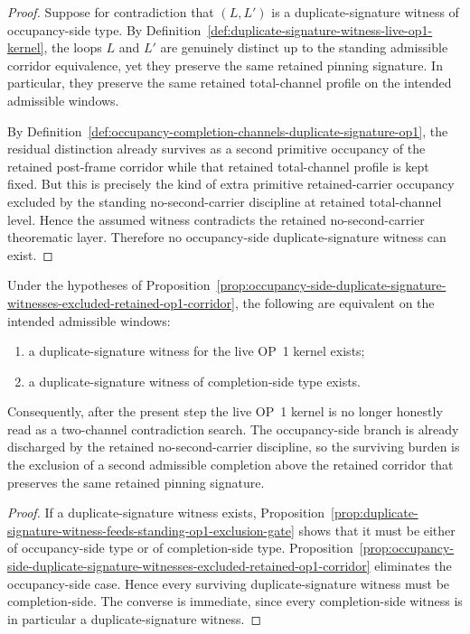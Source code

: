 \begin{proof}
Suppose for contradiction that \((L,L')\) is a duplicate-signature witness of occupancy-side type. By Definition~\ref{def:duplicate-signature-witness-live-op1-kernel}, the loops \(L\) and \(L'\) are genuinely distinct up to the standing admissible corridor equivalence, yet they preserve the same retained pinning signature. In particular, they preserve the same retained total-channel profile on the intended admissible windows.

By Definition~\ref{def:occupancy-completion-channels-duplicate-signature-op1}, the residual distinction already survives as a second primitive occupancy of the retained post-frame corridor while that retained total-channel profile is kept fixed. But this is precisely the kind of extra primitive retained-carrier occupancy excluded by the standing no-second-carrier discipline at retained total-channel level. Hence the assumed witness contradicts the retained no-second-carrier theorematic layer. Therefore no occupancy-side duplicate-signature witness can exist.
\end{proof}

\begin{corollary}
\label{cor:live-op1-duplicate-signature-burden-reduces-completion-side-channel}
Under the hypotheses of Proposition~\ref{prop:occupancy-side-duplicate-signature-witnesses-excluded-retained-op1-corridor}, the following are equivalent on the intended admissible windows:
\begin{enumerate}[label=(\roman*)]
    \item a duplicate-signature witness for the live OP~1 kernel exists;
    \item a duplicate-signature witness of completion-side type exists.
\end{enumerate}
Consequently, after the present step the live OP~1 kernel is no longer honestly read as a two-channel contradiction search. The occupancy-side branch is already discharged by the retained no-second-carrier discipline, so the surviving burden is the exclusion of a second admissible completion above the retained corridor that preserves the same retained pinning signature.
\end{corollary}

\begin{proof}
If a duplicate-signature witness exists, Proposition~\ref{prop:duplicate-signature-witness-feeds-standing-op1-exclusion-gate} shows that it must be either of occupancy-side type or of completion-side type. Proposition~\ref{prop:occupancy-side-duplicate-signature-witnesses-excluded-retained-op1-corridor} eliminates the occupancy-side case. Hence every surviving duplicate-signature witness must be completion-side. The converse is immediate, since every completion-side witness is in particular a duplicate-signature witness.
\end{proof}


